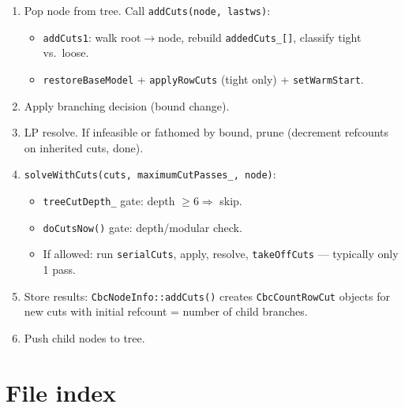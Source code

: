 \documentclass[11pt,a4paper]{article}
\begin{document}
\begin{enumerate}[leftmargin=*]
  \item Pop node from tree.  Call \texttt{addCuts(node, lastws)}:
    \begin{itemize}
      \item \texttt{addCuts1}: walk root$\to$node, rebuild
            \texttt{addedCuts\_[]}, classify tight vs.\ loose.
      \item \texttt{restoreBaseModel} + \texttt{applyRowCuts}
            (tight only) + \texttt{setWarmStart}.
    \end{itemize}
  \item Apply branching decision (bound change).
  \item LP resolve.  If infeasible or fathomed by bound, prune
        (decrement refcounts on inherited cuts, done).
  \item \texttt{solveWithCuts(cuts, maximumCutPasses\_, node)}:
    \begin{itemize}
      \item \texttt{treeCutDepth\_} gate: depth $\ge 6
            \Rightarrow$ skip.
      \item \texttt{doCutsNow()} gate: depth/modular check.
      \item If allowed: run \texttt{serialCuts}, apply, resolve,
            \texttt{takeOffCuts} --- typically only 1 pass.
    \end{itemize}
  \item Store results: \texttt{CbcNodeInfo::addCuts()} creates
        \texttt{CbcCountRowCut} objects for new cuts with initial
        refcount = number of child branches.
  \item Push child nodes to tree.
\end{enumerate}

\section*{File index}
\end{document}
